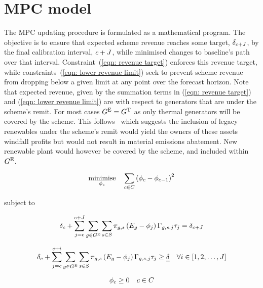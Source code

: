 \documentclass{article}
\DeclareMathOperator*{\minimise}{minimise}
\begin{document}
\section{MPC model}
The MPC updating procedure is formulated as a mathematical program. The objective is to ensure that expected scheme revenue reaches some target, $\cSchemeRevenue[\iCalibrationInterval + \cTotalCalibrationIntervals]$, by the final calibration interval, $\iCalibrationInterval + \cTotalCalibrationIntervals$, while minimised changes to baseline's path over that interval. Constraint~(\ref{eqn: revenue target}) enforces this revenue target, while constraints~(\ref{eqn: lower revenue limit}) seek to prevent scheme revenue from dropping below a given limit at any point over the forecast horizon. Note that expected revenue, given by the summation terms in (\ref{eqn: revenue target}) and (\ref{eqn: lower revenue limit}) are with respect to generators that are under the scheme's remit. For most cases $\sGeneratorsEligible = \sGeneratorsThermal$ as only thermal generators will be covered by the scheme. This follows~\cite{aemc_integration_2016} which suggests the inclusion of legacy renewables under the scheme's remit would yield the owners of these assets windfall profits but would not result in material emissions abatement. New renewable plant would however be covered by the scheme, and included within $\sGeneratorsEligible$.

\begin{equation}
	\minimise\limits_{\vBaseline} \quad \sum\limits_{\iCalibrationInterval \in \sCalibrationIntervals} \left(\vBaseline[\iCalibrationInterval] - \vBaseline[\iCalibrationInterval-1]\right)^{2}
\end{equation}

subject to

\begin{equation}
	\cSchemeRevenue[\iCalibrationInterval] + \sum\limits_{\iCalibrationIntervalAlias=\iCalibrationInterval}^{\iCalibrationInterval + \cTotalCalibrationIntervals} \sum\limits_{\iGenerator \in \sGeneratorsEligible} \sum\limits_{\iScenario \in \sScenarios} \cScenarioProbibility \left(\cEmissionsIntensity - \vBaseline[\iCalibrationIntervalAlias]\right) \cCalibrationIntervalEnergy[\iGenerator,\iScenario,\iCalibrationIntervalAlias] \vPermitPrice[\iCalibrationIntervalAlias] = \cSchemeRevenue[\iCalibrationInterval+\cTotalCalibrationIntervals]
	\label{eqn: revenue target}
\end{equation}

\begin{equation}
	\cSchemeRevenue[\iCalibrationInterval] + \sum\limits_{\iCalibrationIntervalAlias=\iCalibrationInterval}^{\iCalibrationInterval + i} \sum\limits_{\iGenerator \in \sGeneratorsEligible} \sum\limits_{\iScenario \in \sScenarios} \cScenarioProbibility \left(\cEmissionsIntensity - \vBaseline[\iCalibrationIntervalAlias]\right) \cCalibrationIntervalEnergy[\iGenerator,\iScenario,\iCalibrationIntervalAlias] \vPermitPrice[\iCalibrationIntervalAlias] \geq \cSchemeRevenueLowerBound \quad   \forall i \in \left[1, 2, \ldots, \cTotalCalibrationIntervals \right]
	\label{eqn: lower revenue limit}
\end{equation}

\begin{equation}
	\vBaseline \geq 0 \quad  \iCalibrationInterval \in \sCalibrationIntervals
	\label{eqn: non-negative baseline}
\end{equation}

 

\end{document}
